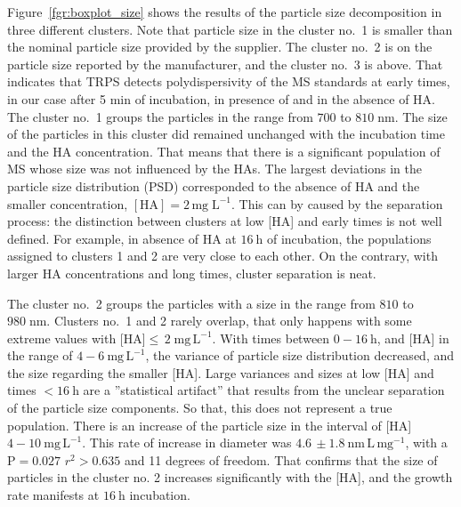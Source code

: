 \documentclass[journal=langd5,manuscript=article]{achemso}
\begin{document}
Figure~\ref{fgr:boxplot_size} shows the results of the particle size decomposition in three different clusters. Note that particle size in the cluster no.~1 is smaller than the nominal particle size provided by the supplier. 
The cluster no.~2 is on the particle size reported by the manufacturer, and the cluster no.~3 is above. That indicates that TRPS detects polydispersivity of the MS standards at early times, in our case after 5 min of incubation, in presence of  and in the absence of HA.
The cluster no.~1 groups the particles in the range from $700$ to $810\;\mathrm{nm}$. The size of the particles in this cluster did remained unchanged with the incubation time and the HA concentration. That means that there is a significant population of MS whose size was not influenced by the HAs. The largest deviations in the particle size distribution (PSD) corresponded to the absence of HA and the smaller concentration, $\mathrm{[HA]  = 2\,mg\;L^{-1}}$.
This can by caused by the separation process: the distinction between clusters at low [HA] and early times is not well defined. For example, in absence of HA at $16~\mathrm{h}$ of incubation, the populations assigned to clusters 1 and 2 are very close to each other. On the contrary, with larger HA concentrations and long  times, cluster separation is neat.


The cluster no.~2 groups the particles with a size in the range from $810$ to $980\;\mathrm{nm}$. Clusters no.~1 and 2 rarely overlap, that only happens with some extreme values with [HA]$\leq\, 2\;\mathrm{mg\,L^{-1}}$. With times between $0 -16~\mathrm{h}$, and [HA] in the range of $4 - 6~\mathrm{mg\, L^{-1}}$, the variance of particle size distribution decreased, and the size regarding the smaller [HA]. Large variances  and sizes at low [HA] and times $< 16~\mathrm{h}$ are a ''statistical artifact'' that results from the unclear separation of the particle size components. So that, this does not represent a true population. There is an increase of the particle size in the interval of [HA] $4-10~\mathrm{mg\,L^{-1}}$. This rate of increase in diameter was $4.6\,\pm 1.8~\mathrm{nm\,L\,mg^{-1}}$, with a $\mathrm{P = 0.027}$ $r^2 > 0.635$ and 11 degrees of freedom. 
% 
% 
That confirms that the size of particles in the cluster no. 2 increases significantly with the [HA], and the growth rate manifests at $16~\mathrm{h}$ incubation.
\end{document}
